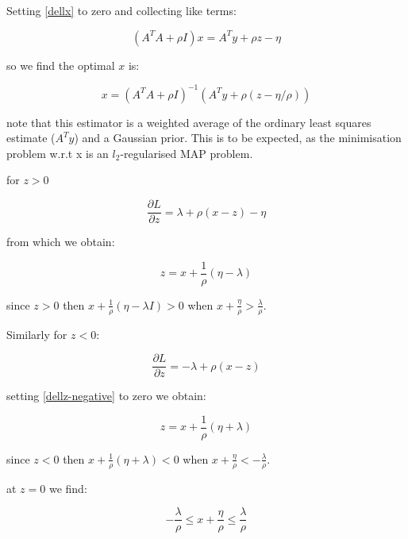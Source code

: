 Setting \eqref{dellx} to zero and collecting like terms:

\begin{equation}
\left(A^TA + \rho I\right)x = A^Ty + \rho z - \eta
\end{equation}

so we find the optimal \(x\) is:

\begin{equation}
x = \left(A^T A + \rho I\right)^{-1}\left(A^Ty + \rho \left( z - \eta/\rho\right)\right)
\label{optx}
\end{equation}

note that this estimator is a weighted average of the ordinary least squares estimate (\(A^Ty\)) and a Gaussian prior. This is to be expected, as the minimisation problem w.r.t x is an \(l_2\)-regularised MAP problem.

for \(z > 0\)

\begin{equation}
\frac{\partial L} {\partial z} = \lambda + \rho (x-z) - \eta
\label{dellz-positive}
\end{equation}

from which we obtain:

\begin{equation*}
z = x + \frac{1}{\rho} ( \eta - \lambda )
\end{equation*}

since \(z>0\) then \(x + \frac{1}{\rho} ( \eta - \lambda I) > 0\) when \(x + \frac{\eta}{\rho} > \frac{\lambda}{\rho}\).

Similarly for \(z < 0\):

\begin{equation}
\frac{\partial L} {\partial z} = -\lambda + \rho (x-z) 
\label{dellz-negative}
\end{equation}

setting \eqref{dellz-negative} to zero we obtain:

\begin{equation*}
z = x + \frac{1}{\rho}(\eta + \lambda)
\end{equation*}

since \(z<0\) then \(x + \frac{1}{\rho} ( \eta + \lambda ) < 0\) when \(x + \frac{\eta}{\rho} < - \frac{\lambda}{\rho}\).

at \(z=0\) we find:

\begin{equation*}
-\frac{\lambda}{\rho} \leq x + \frac{\eta}{\rho} \leq \frac{\lambda}{\rho}
\end{equation*}

